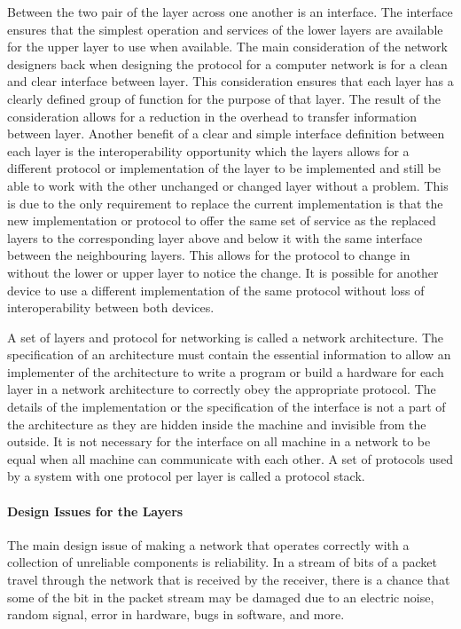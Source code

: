 Between the two pair of the layer across one another is an interface. The interface ensures that the simplest operation and services of the lower layers are available for the upper layer to use when available. The main consideration of the network designers back when designing the protocol for a computer network is for a clean and clear interface between layer. This consideration ensures that each layer has a clearly defined group of function for the purpose of that layer. The result of the consideration allows for a reduction in the overhead to transfer information between layer. Another benefit of a clear and simple interface definition between each layer is the interoperability opportunity which the layers allows for a different protocol or implementation of the layer to be implemented and still be able to work with the other unchanged or changed layer without a problem. This is due to the only requirement to replace the current implementation is that the new implementation or protocol to offer the same set of service as the replaced layers to the corresponding layer above and below it with the same interface between the neighbouring layers. This allows for the protocol to change in without the lower or upper layer to notice the change. It is possible for another device to use a different implementation of the same protocol without loss of interoperability between both devices. 

A set of layers and protocol for networking is called a network architecture. The specification of an architecture must contain the essential information to allow an implementer of the architecture to write a program or build a hardware for each layer in a network architecture to correctly obey the appropriate protocol. The details of the implementation or the specification of the interface is not a part of the architecture as they are hidden inside the machine and invisible from the outside. It is not necessary for the interface on all machine in a network to be equal when all machine can communicate with each other. A set of protocols used by a system with one protocol per layer is called a protocol stack.

\paragraph{Design Issues for the Layers}
The main design issue of making a network that operates correctly with a collection of unreliable components is reliability. In a stream of bits of a packet travel through the network that is received by the receiver, there is a chance that some of the bit in the packet stream may be damaged due to an electric noise, random signal, error in hardware, bugs in software, and more. 

